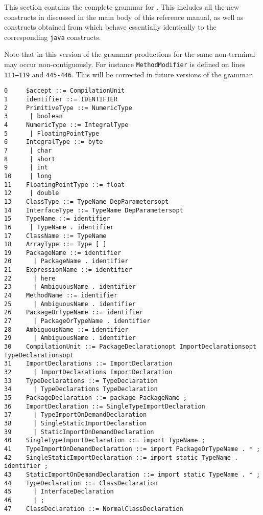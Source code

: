 \onecolumn
{}\label{X10 syntax}

This section contains the complete grammar for \Xten{}. This includes
all the new constructs in \Xten{} discussed in the main body of this
reference manual, as well as constructs obtained from \java{} which
behave essentially identically to the corresponding {\tt java} constructs.

Note that in this version of the grammar productions for the same
non-terminal may occur non-contiguously. For instance 
{\tt MethodModifier} is defined on lines {\tt 111--119} and
{\tt 445-446}. This will be corrected in future versions of the grammar.

{\footnotesize
\begin{verbatim}
0     $accept ::= CompilationUnit
1     identifier ::= IDENTIFIER
2     PrimitiveType ::= NumericType
3      | boolean
4     NumericType ::= IntegralType
5      | FloatingPointType
6     IntegralType ::= byte
7      | char
8      | short
9      | int
10     | long
11    FloatingPointType ::= float
12     | double
13    ClassType ::= TypeName DepParametersopt
14    InterfaceType ::= TypeName DepParametersopt
15    TypeName ::= identifier
16     | TypeName . identifier
17    ClassName ::= TypeName
18    ArrayType ::= Type [ ]
19    PackageName ::= identifier
20      | PackageName . identifier
21    ExpressionName ::= identifier
22      | here
23      | AmbiguousName . identifier
24    MethodName ::= identifier
25      | AmbiguousName . identifier
26    PackageOrTypeName ::= identifier
27      | PackageOrTypeName . identifier
28    AmbiguousName ::= identifier
29      | AmbiguousName . identifier
30    CompilationUnit ::= PackageDeclarationopt ImportDeclarationsopt TypeDeclarationsopt
31    ImportDeclarations ::= ImportDeclaration
32      | ImportDeclarations ImportDeclaration
33    TypeDeclarations ::= TypeDeclaration
34      | TypeDeclarations TypeDeclaration
35    PackageDeclaration ::= package PackageName ;
36    ImportDeclaration ::= SingleTypeImportDeclaration
37      | TypeImportOnDemandDeclaration
38      | SingleStaticImportDeclaration
39      | StaticImportOnDemandDeclaration
40    SingleTypeImportDeclaration ::= import TypeName ;
41    TypeImportOnDemandDeclaration ::= import PackageOrTypeName . * ;
42    SingleStaticImportDeclaration ::= import static TypeName . identifier ;
43    StaticImportOnDemandDeclaration ::= import static TypeName . * ;
44    TypeDeclaration ::= ClassDeclaration
45      | InterfaceDeclaration
46      | ;
47    ClassDeclaration ::= NormalClassDeclaration

\end{verbatim}}
